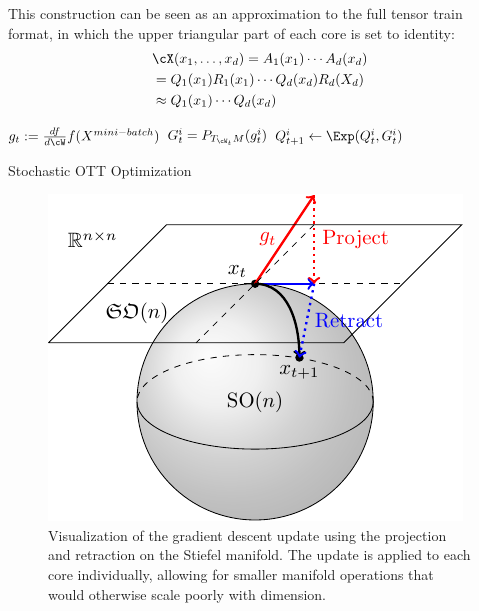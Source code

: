 This construction can be seen as an approximation to the full tensor train format, in which the upper triangular part of each core is set to identity:
\begin{align*}
&\cX(x_1,\ldots,x_d) = A_1(x_1)\cdots A_d(x_d) \\ &= Q_1(x_1)R_1(x_1)\cdots Q_d(x_d)R_d(X_d) \\
&\approx Q_1(x_1) \cdots Q_d(x_d) %
\end{align*}

\begin{algorithm}[H]
	\begin{algorithmic}
		\State $g_t := \frac{df}{d\cW} f(X^{mini-batch})$
		\State $G^i_t = P_{T_{\cW_t}M}(g^i_t)$ 
		\State $Q^i_{t+1} \leftarrow \Exp(Q^i_t, G^i_t)$ 
		\EndFor
		\EndFor
	\end{algorithmic}
	\caption*{\footnotesize Stochastic OTT Optimization}
\end{algorithm}

\begin{figure}
	\centering
	\includegraphics[width=0.5\columnwidth,trim={0 1.5cm 0 0},clip]{diss/4_ott/figs/stiefel_update.pdf}
	\caption[Gradient Descent Update on Stiefel Manifolds]{\footnotesize Visualization of the gradient descent update using the projection and retraction on the Stiefel manifold. The update is applied to each core individually, allowing for smaller manifold operations that would otherwise scale poorly with dimension.}
\end{figure}


